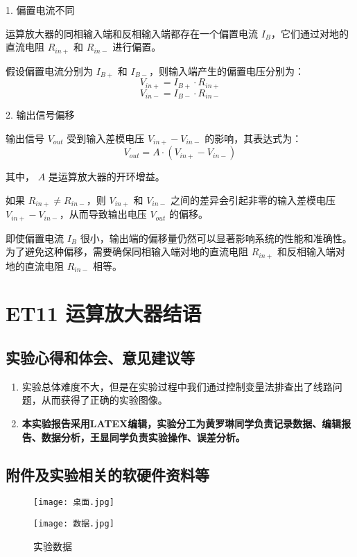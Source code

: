 \documentclass[dvipsnames, svgnames,a4paper,11pt]{article}
\begin{document}
1. 偏置电流不同

运算放大器的同相输入端和反相输入端都存在一个偏置电流 \( I_B \)，它们通过对地的直流电阻 \( R_{in+} \) 和 \( R_{in-} \) 进行偏置。

假设偏置电流分别为 \( I_{B+} \) 和 \( I_{B-} \)，则输入端产生的偏置电压分别为：
\[ V_{in+} = I_{B+} \cdot R_{in+} \]
\[ V_{in-} = I_{B-} \cdot R_{in-} \]

2. 输出信号偏移

输出信号 \( V_{out} \) 受到输入差模电压 \( V_{in+} - V_{in-} \) 的影响，其表达式为：
\[ V_{out} = A \cdot (V_{in+} - V_{in-}) \]

其中， \( A \) 是运算放大器的开环增益。

如果 \( R_{in+} \neq R_{in-} \)，则 \( V_{in+} \) 和 \( V_{in-} \) 之间的差异会引起非零的输入差模电压 \( V_{in+} - V_{in-} \)，从而导致输出电压 \( V_{out} \) 的偏移。

即使偏置电流 \( I_B \) 很小，输出端的偏移量仍然可以显著影响系统的性能和准确性。为了避免这种偏移，需要确保同相输入端对地的直流电阻 \( R_{in+} \) 和反相输入端对地的直流电阻 \( R_{in-} \) 相等。

	\clearpage
	
	\section{ET11 运算放大器\quad\heiti 结语}
	
	\subsection{实验心得和体会、意见建议等}
	\begin{enumerate}
		\item 实验总体难度不大，但是在实验过程中我们通过控制变量法排查出了线路问题，从而获得了正确的实验图像。
		\item \textbf{本实验报告采用LATEX编辑，实验分工为黄罗琳同学负责记录数据、编辑报告、数据分析，王显同学负责实验操作、误差分析。}
	\end{enumerate}
	

	\subsection{附件及实验相关的软硬件资料等} 
	\begin{figure}[{H}]
		\centering
		\texttt{[image: 桌面.jpg]}
	\end{figure}
	\begin{figure}[{H}]
		\centering
		\texttt{[image: 数据.jpg]}
		\caption{实验数据}
		\label{}
	\end{figure}

	
	
\end{document}
